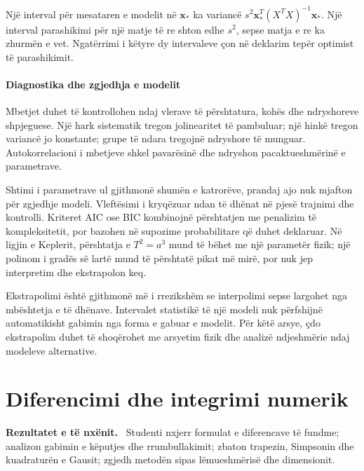 \documentclass[11pt,oneside,openany]{book}
\newcommand{\vect}[1]{\bm{#1}}
\newenvironment{qellime}{\par\medskip\noindent\textbf{Rezultatet e të nxënit.}\ }{\par\medskip}
\begin{document}
Një interval për mesataren e modelit në $\vect x_*$ ka variancë $s^2\vect x_*^T(X^TX)^{-1}\vect x_*$. Një interval parashikimi për një matje të re shton edhe $s^2$, sepse matja e re ka zhurmën e vet. Ngatërrimi i këtyre dy intervaleve çon në deklarim tepër optimist të parashikimit.

\subsubsection{Diagnostika dhe zgjedhja e modelit}
Mbetjet duhet të kontrollohen ndaj vlerave të përshtatura, kohës dhe ndryshoreve shpjeguese. Një hark sistematik tregon jolinearitet të pambuluar; një hinkë tregon variancë jo konstante; grupe të ndara tregojnë ndryshore të munguar. Autokorrelacioni i mbetjeve shkel pavarësinë dhe ndryshon pacaktueshmërinë e parametrave.

Shtimi i parametrave ul gjithmonë shumën e katrorëve, prandaj ajo nuk mjafton për zgjedhje modeli. Vleftësimi i kryqëzuar ndan të dhënat në pjesë trajnimi dhe kontrolli. Kriteret AIC ose BIC kombinojnë përshtatjen me penalizim të kompleksitetit, por bazohen në supozime probabilitare që duhet deklaruar. Në ligjin e Keplerit, përshtatja e $T^2=a^3$ mund të bëhet me një parametër fizik; një polinom i gradës së lartë mund të përshtatë pikat më mirë, por nuk jep interpretim dhe ekstrapolon keq.

Ekstrapolimi është gjithmonë më i rrezikshëm se interpolimi sepse largohet nga mbështetja e të dhënave. Intervalet statistikë të një modeli nuk përfshijnë automatikisht gabimin nga forma e gabuar e modelit. Për këtë arsye, çdo ekstrapolim duhet të shoqërohet me arsyetim fizik dhe analizë ndjeshmërie ndaj modeleve alternative.





\chapter{Diferencimi dhe integrimi numerik}
\begin{qellime}
Studenti nxjerr formulat e diferencave të fundme; analizon gabimin e këputjes dhe rrumbullakimit; zbaton trapezin, Simpsonin dhe kuadraturën e Gausit; zgjedh metodën sipas lëmueshmërisë dhe dimensionit.
\end{qellime}
\end{document}
